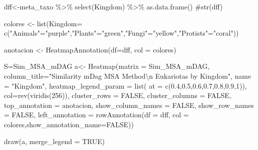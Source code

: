 \documentclass[
  letterpaper,
  DIV=11,
  numbers=noendperiod]{scrreprt}
\newenvironment{Shaded}{\begin{snugshade}}{\end{snugshade}}
\newcommand{\AttributeTok}[1]{\textcolor[rgb]{0.40,0.45,0.13}{#1}}
\newcommand{\CommentTok}[1]{\textcolor[rgb]{0.37,0.37,0.37}{#1}}
\newcommand{\ConstantTok}[1]{\textcolor[rgb]{0.56,0.35,0.01}{#1}}
\newcommand{\DecValTok}[1]{\textcolor[rgb]{0.68,0.00,0.00}{#1}}
\newcommand{\FloatTok}[1]{\textcolor[rgb]{0.68,0.00,0.00}{#1}}
\newcommand{\FunctionTok}[1]{\textcolor[rgb]{0.28,0.35,0.67}{#1}}
\newcommand{\NormalTok}[1]{\textcolor[rgb]{0.00,0.23,0.31}{#1}}
\newcommand{\OtherTok}[1]{\textcolor[rgb]{0.00,0.23,0.31}{#1}}
\newcommand{\SpecialCharTok}[1]{\textcolor[rgb]{0.37,0.37,0.37}{#1}}
\newcommand{\StringTok}[1]{\textcolor[rgb]{0.13,0.47,0.30}{#1}}
\begin{document}
\begin{Shaded}
\begin{Highlighting}[]
\NormalTok{dff}\OtherTok{\textless{}{-}}\NormalTok{meta\_taxo }\SpecialCharTok{\%\textgreater{}\%} \FunctionTok{select}\NormalTok{(Kingdom)  }\SpecialCharTok{\%\textgreater{}\%} \FunctionTok{as.data.frame}\NormalTok{()}
\CommentTok{\#str(dff)}

\NormalTok{colores }\OtherTok{\textless{}{-}} \FunctionTok{list}\NormalTok{(}\AttributeTok{Kingdom=} \FunctionTok{c}\NormalTok{(}\StringTok{"Animals"}\OtherTok{=}\StringTok{"purple"}\NormalTok{,}\StringTok{"Plants"}\OtherTok{=}\StringTok{"green"}\NormalTok{,}\StringTok{"Fungi"}\OtherTok{=}\StringTok{"yellow"}\NormalTok{,}\StringTok{"Protists"}\OtherTok{=}\StringTok{"coral"}\NormalTok{))}

\NormalTok{anotacion }\OtherTok{\textless{}{-}} \FunctionTok{HeatmapAnnotation}\NormalTok{(}\AttributeTok{df=}\NormalTok{dff, }\AttributeTok{col =}\NormalTok{ colores)}

\NormalTok{S}\OtherTok{=}\NormalTok{Sim\_MSA\_mDAG}
\NormalTok{a}\OtherTok{\textless{}{-}} \FunctionTok{Heatmap}\NormalTok{(}\AttributeTok{matrix =}\NormalTok{ Sim\_MSA\_mDAG, }
                          \AttributeTok{column\_title=}\StringTok{"Similarity mDag MSA Method}\SpecialCharTok{\textbackslash{}n}\StringTok{  Eukariotas by Kingdom"}\NormalTok{,}
            \AttributeTok{name =} \StringTok{"Kingdom"}\NormalTok{,}
            \AttributeTok{heatmap\_legend\_param =} \FunctionTok{list}\NormalTok{(}
    \AttributeTok{at =} \FunctionTok{c}\NormalTok{(}\FloatTok{0.4}\NormalTok{,}\FloatTok{0.5}\NormalTok{,}\FloatTok{0.6}\NormalTok{,}\FloatTok{0.7}\NormalTok{,}\FloatTok{0.8}\NormalTok{,}\FloatTok{0.9}\NormalTok{,}\DecValTok{1}\NormalTok{)),}
        \AttributeTok{col=}\FunctionTok{rev}\NormalTok{(}\FunctionTok{viridis}\NormalTok{(}\DecValTok{256}\NormalTok{)),}
        \AttributeTok{cluster\_rows =} \ConstantTok{FALSE}\NormalTok{,}
        \AttributeTok{cluster\_columns =} \ConstantTok{FALSE}\NormalTok{,}
        \AttributeTok{top\_annotation =}\NormalTok{ anotacion,}
        \AttributeTok{show\_column\_names =} \ConstantTok{FALSE}\NormalTok{, }
        \AttributeTok{show\_row\_names =} \ConstantTok{FALSE}\NormalTok{,}
        \AttributeTok{left\_annotation =} \FunctionTok{rowAnnotation}\NormalTok{(}\AttributeTok{df =}\NormalTok{ dff, }\AttributeTok{col =}\NormalTok{ colores,}\AttributeTok{show\_annotation\_name=}\ConstantTok{FALSE}\NormalTok{))}
  
\FunctionTok{draw}\NormalTok{(a, }\AttributeTok{merge\_legend =} \ConstantTok{TRUE}\NormalTok{)}
\end{Highlighting}
\end{Shaded}
\end{document}
